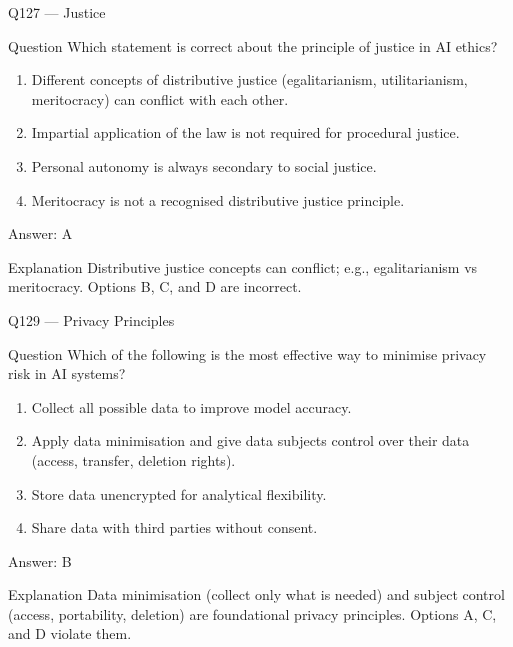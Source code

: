 \documentclass[aspectratio=169,8pt]{beamer}
\begin{document}
\begin{frame}{Q127 --- Justice}
\begin{block}{Question}
Which statement is correct about the principle of justice in AI ethics?
\begin{enumerate}
\item Different concepts of distributive justice (egalitarianism, utilitarianism, meritocracy) can conflict with each other.
\item Impartial application of the law is not required for procedural justice.
\item Personal autonomy is always secondary to social justice.
\item Meritocracy is not a recognised distributive justice principle.
\end{enumerate}
	\end{block}
\begin{exampleblock}{Answer: A}\end{exampleblock}
\begin{block}{Explanation}
Distributive justice concepts can conflict; e.g., egalitarianism vs meritocracy. Options B, C, and D are incorrect.
\end{block}
\end{frame}

\begin{frame}{Q129 --- Privacy Principles}
\begin{block}{Question}
Which of the following is the most effective way to minimise privacy risk in AI systems?
\begin{enumerate}
\item Collect all possible data to improve model accuracy.
\item Apply data minimisation and give data subjects control over their data (access, transfer, deletion rights).
\item Store data unencrypted for analytical flexibility.
\item Share data with third parties without consent.
\end{enumerate}
	\end{block}
\begin{exampleblock}{Answer: B}\end{exampleblock}
\begin{block}{Explanation}
Data minimisation (collect only what is needed) and subject control (access, portability, deletion) are foundational privacy principles. Options A, C, and D violate them.
\end{block}
\end{frame}
\end{document}
